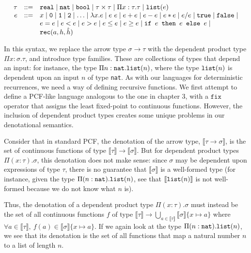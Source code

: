  \[
\begin{array}{rcl}
\tau &::=& \texttt{real} \mid \texttt{nat} \mid \texttt{bool} \mid \tau \times \tau \mid \Pi x:\tau.\tau
\mid \texttt{list}(e) \\
e &::=& x  \mid \texttt{0} \mid \texttt{1} \mid \texttt{2} \mid \dotsc \mid \lambda x.e \mid e \ e \mid e + e \mid e - e \mid  e  *  e \mid e / e \mid \texttt{true} \mid \texttt{false} \mid \\
  && e  =  e \mid e < e \mid e > e \mid e \leq e \mid e \geq e \mid 
     \texttt{if } e \texttt{ then } e \texttt{ else } e \mid \\
     && \texttt{rec}(a, h, \hat{h}) 
\end{array}
\]

In this syntax, we replace the arrow type $\sigma \rightarrow \tau$ with the dependent product type
$\Pi x:\sigma.\tau$, and introduce type families. 
These are collections of types that depend an input: for instance,
the type $\Pi n:\texttt{nat}.\texttt{list}(n)$, where the type $\texttt{list}(n)$ is dependent upon an input $n$ of type \texttt{nat}.
As with our languages for deterministic recurrences, we need a way of defining recursive functions. We first attempt
to define a PCF-like language analogous to the one in chapter 3, with a $\texttt{fix}$ operator that assigns the least
fixed-point to continuous functions. However, the inclusion of dependent product types creates some unique problems
in our denotational semantics.

Consider that in standard PCF, the denotation of the arrow type, $\llbracket \tau \rightarrow \sigma \rrbracket$, is the
set of continuous functions of type
$\llbracket \tau \rrbracket \rightarrow \llbracket \sigma \rrbracket$. But for dependent product types $\Pi(x:\tau).\sigma$,
this denotation does not make sense: 
since $\sigma$ may be dependent upon expressions of type $\tau$, there is no guarantee
that $\llbracket \sigma \rrbracket$ is a well-formed type (for instance, given the type $\Pi(n:\texttt{nat}).\texttt{list}(n)$, see that
$\llbracket \texttt{list}(n) \rrbracket$ is not well-formed because we do not know what $n$ is).

Thus, the denotation of a dependent product type $\Pi(x:\tau).\sigma$ must instead be the set of all
continuous functions $f$ 
of type $\llbracket \tau \rrbracket \rightarrow \bigcup_{a \in \llbracket \tau \rrbracket} \llbracket \sigma \rrbracket\{x \mapsto a\}$
where $\forall a \in \llbracket \tau \rrbracket, \ f(a) \in \llbracket \sigma \rrbracket\{x \mapsto a\}$. If we again look at the 
type $\Pi(n:\texttt{nat}).\texttt{list}(n)$, we see that its denotation is the set of all functions that map a natural number $n$ 
to a list of length $n$.

